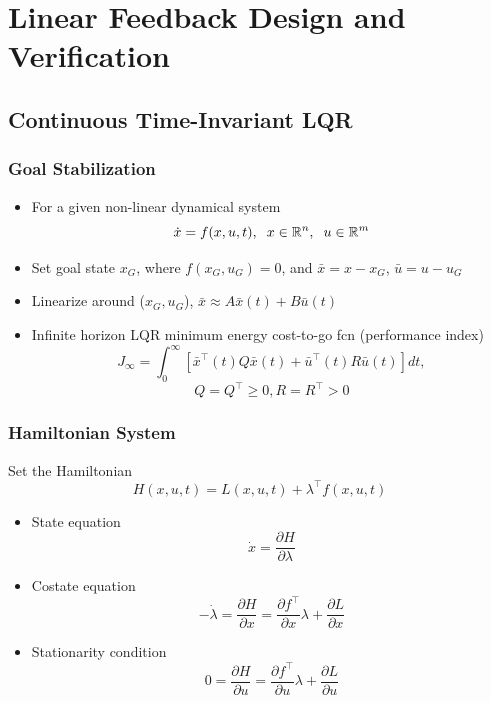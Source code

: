 \documentclass{beamer}
\begin{document}
\section{Linear Feedback Design and Verification}

\subsection{Continuous Time-Invariant LQR}

\begin{frame}
\frametitle{Goal Stabilization}
\begin{itemize}
\item For a given non-linear dynamical system
\begin{equation*}
\dot{x} = f(x,u,t), \hspace{.2cm} x\in \mathbb{R}^n, \hspace{.2cm} u\in \mathbb{R}^m 
\end{equation*} 
\item Set goal state $x_G$, where $f(x_G,u_G)=0$, and $\bar{x}=x-x_G$, $\bar{u}=u-u_G$
\item Linearize around ($x_G, u_G$), $\bar{x}\approx A\bar{x}(t)+B\bar{u}(t)$ 
\item Infinite horizon LQR minimum energy cost-to-go fcn (performance index)
\begin{equation*}
J_{\infty}= \int_0^{\infty} [ \bar{x}^{\intercal}(t)Q\bar{x}(t)+\bar{u}^{\intercal}(t)R\bar{u}(t)]dt,
\end{equation*}
\begin{equation*}
Q=Q^{\intercal}\geq 0, R=R^{\intercal}> 0
\end{equation*}
\end{itemize}
\end{frame}


\begin{frame}
\frametitle{Hamiltonian System}
Set the Hamiltonian 
\begin{equation*}
H(x,u,t)= L(x,u,t)+\lambda^{\intercal} f(x,u,t)
\end{equation*} 
\begin{itemize}
\item State equation
\begin{equation*}
\dot{x}=\frac{\partial H}{\partial \lambda}
\end{equation*}
\item Costate equation
\begin{equation*}
-\dot{\lambda} = \frac{\partial H}{\partial x}=\frac{\partial f^{\intercal}}{\partial x}\lambda + \frac{\partial L}{\partial x}
\end{equation*}
\item Stationarity condition
\begin{equation*}
0 = \frac{\partial H}{\partial u}=\frac{\partial f^{\intercal}}{\partial u}\lambda + \frac{\partial L}{\partial u}
\end{equation*}
\end{itemize}
\end{frame}
\end{document}
